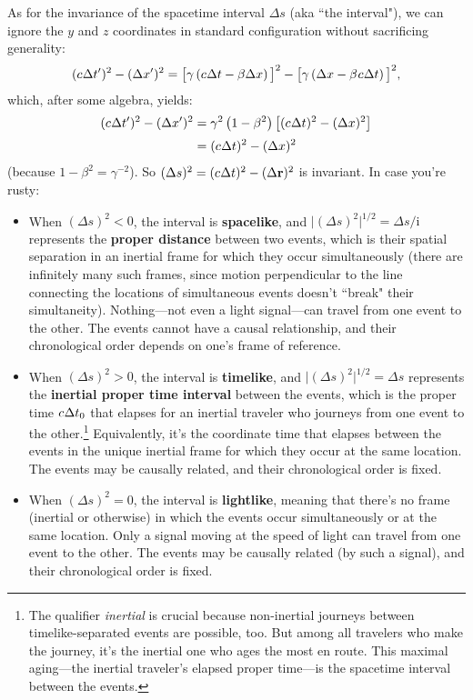 \documentclass[12pt]{article}
\renewcommand{\vv}[1]{\mathbf{#1}}
\begin{document}
As for the invariance of the spacetime interval $\Delta s$ (aka ``the interval"), we can ignore the $y$ and $z$ coordinates in standard configuration without sacrificing generality:
\begin{equation*}
(c \mkern.5mu \Delta t^{\prime})^2 - (\Delta x^{\prime})^2 = \big[ \gamma \left( c \mkern.5mu \Delta t - \beta \Delta x \right) \big] ^2 - \big[ \gamma \left( \Delta x - \beta \mkern1mu c \mkern.5mu \Delta t \right) \big]^2 ,
\end{equation*}
which, after some algebra, yields:
\begin{equation*}
\begin{aligned}
(c \mkern.5mu \Delta t^{\prime})^2 - (\Delta x^{\prime})^2 &= \gamma^2 \left( 1 - \beta^2 \right) \left[ (c \mkern.5mu \Delta t)^2 - ( \Delta x )^2 \right] \\[2pt]
&= (c \mkern.5mu \Delta t)^2 - ( \Delta x )^2
\end{aligned}
\end{equation*}
(because $1 - \beta^2 = \gamma^{-2}$). So $(\Delta s)^2 = (c \mkern.5mu \Delta t)^2 - ( \Delta \vv r )^2$ is invariant. In case you're rusty:
\begin{itemize}
\item When $(\Delta s)^2<0$, the interval is \textbf{spacelike}, and $\lvert (\Delta s)^2 \rvert ^{1/2} = \Delta s / \mathrm{i}$ represents the \textbf{proper distance} between two events, which is their spatial separation in an inertial frame for which they occur simultaneously (there are infinitely many such frames, since motion perpendicular to the line connecting the locations of simultaneous events doesn't ``break" their simultaneity). Nothing---not even a light signal---can travel from one event to the other. The events cannot have a causal relationship, and their chronological order depends on one's frame of reference.
\item When $(\Delta s)^2>0$, the interval is \textbf{timelike}, and $\lvert(\Delta s)^2\rvert ^{1/2} = \Delta s $ represents the \textbf{inertial proper time interval} between the events, which is the proper time $c \mkern.5mu \Delta t_0$ that elapses for an inertial traveler who journeys from one event to the other.\footnote{The qualifier \emph{inertial} is crucial because non-inertial journeys between timelike-separated events are possible, too. But among all travelers who make the journey, it's the inertial one who ages the most en route. This maximal aging---the inertial traveler's elapsed proper time---is the spacetime interval between the events.} Equivalently, it's the coordinate time that elapses between the events in the unique inertial frame for which they occur at the same location. The events may be causally related, and their chronological order is fixed.
\item When $(\Delta s)^2=0$, the interval is \textbf{lightlike}, meaning that there's no frame (inertial or otherwise) in which the events occur simultaneously or at the same location. Only a signal moving at the speed of light can travel from one event to the other. The events may be causally related (by such a signal), and their chronological order is fixed.
\end{itemize}
\end{document}
